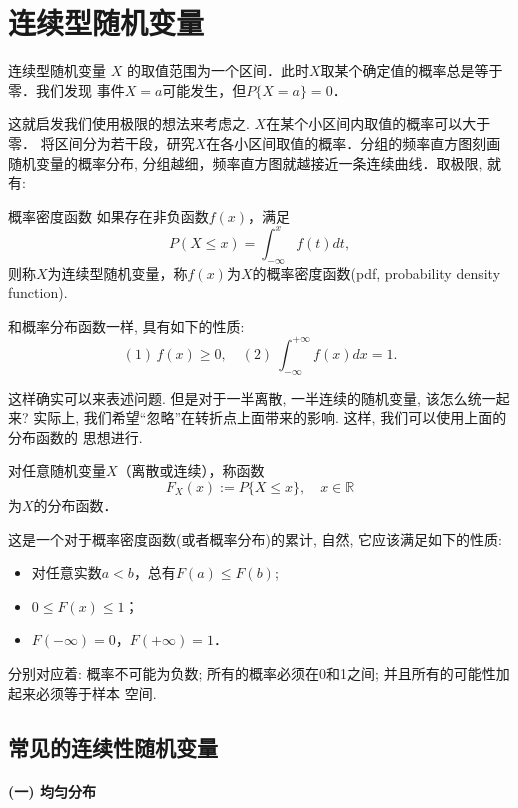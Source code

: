\section{连续型随机变量}
连续型随机变量 $X$ 的取值范围为一个区间．此时$X$取某个确定值的概率总是等于零．我们发现
事件$X=a$可能发生，但$P\{X=a\}=0$．

这就启发我们使用极限的想法来考虑之. $X$在某个小区间内取值的概率可以大于零．
将区间分为若干段，研究$X$在各小区间取值的概率．分组的频率直方图刻画随机变量的概率分布,
分组越细，频率直方图就越接近一条连续曲线．取极限, 就有:

\begin{definition}{概率密度函数}
    如果存在非负函数$f(x)$，满足
    $$
        P(X\leq x)=\int_{-\infty}^{x}f(t)dt,
    $$
    则称$X$为连续型随机变量，称$f(x)$为$X$的概率密度函数(pdf, probability density function).
\end{definition}

和概率分布函数一样, 具有如下的性质:
    $$
    (1)\,f(x)\ge 0,\quad (2)\ \int_{-\infty}^{+\infty}f(x)dx=1.
$$

这样确实可以来表述问题. 但是对于一半离散, 一半连续的随机变量, 该怎么统一起来?
实际上, 我们希望``忽略''在转折点上面带来的影响. 这样, 我们可以使用上面的分布函数的
思想进行.

\begin{definition}
    对任意随机变量$X$（离散或连续），称函数
    $$F_X(x):=P\{X\le x\},\quad x\in \mathbb{R}$$
    为$X$的分布函数．
\end{definition}
这是一个对于概率密度函数(或者概率分布)的累计, 自然, 它应该满足如下的性质:

\begin{itemize}
    \item 对任意实数$a<b$，总有$F(a)\le F(b)$;
    \item $0 \le F(x) \le 1$；
    \item $F(-\infty)=0$，$F(+\infty)=1$．
\end{itemize}
分别对应着: 概率不可能为负数; 所有的概率必须在0和1之间; 并且所有的可能性加起来必须等于样本
空间.
\subsection{常见的连续性随机变量}

\paragraph{(一) 均匀分布}

